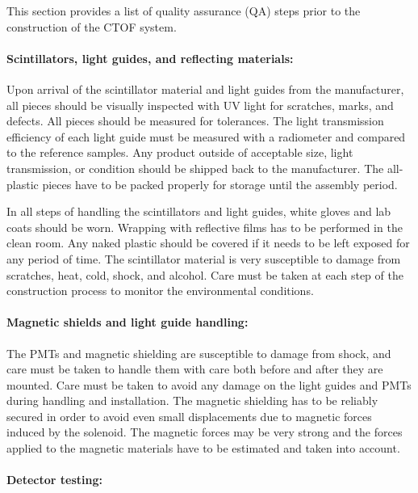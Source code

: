 This section provides a list of quality assurance (QA) steps prior to
the construction of the CTOF system. 

\paragraph{Scintillators, light guides, and reflecting materials:} 

Upon arrival of the scintillator material and light guides from the 
manufacturer, all pieces should be visually inspected with UV light 
for scratches, marks, and defects.  All pieces should be measured for 
tolerances.  The light transmission efficiency of each light guide must 
be measured with a radiometer and compared to the reference samples.
Any product outside of acceptable size, light transmission, or condition 
should be shipped back to the manufacturer.  The all-plastic pieces have 
to be packed properly for storage until the assembly period.

In all steps of handling the scintillators and light guides, white gloves 
and lab coats should be worn.  Wrapping with reflective films has to be 
performed in the clean room.  Any naked plastic should be covered if it 
needs to be left exposed for any period of time.  The scintillator material 
is very susceptible to damage from scratches, heat, cold, shock, and alcohol.
Care must be taken at each step of the construction process to monitor
the environmental conditions.

\paragraph{Magnetic shields and light guide handling:} 

The PMTs and magnetic shielding are susceptible to damage from shock, and 
care must be taken to handle them with care both before and after they are 
mounted.  Care must be taken to avoid any damage on the light guides and 
PMTs during handling and installation.  The magnetic shielding has to be 
reliably secured in order to avoid even small displacements due to magnetic 
forces induced by the solenoid.  The magnetic forces may be very strong and 
the forces applied to the magnetic materials have to be estimated and taken 
into account.

\paragraph{Detector testing:} 

